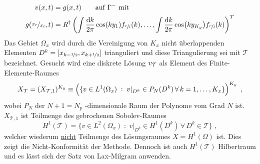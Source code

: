 \begin{equation}
  \begin{aligned}
    v(x,t) &= g(x,t) \qquad \text{auf }{\Gamma^-} \text{ mit} \\
    g(\nicefrac{x_r}{x_l},t) &= R^{\dagger} \left(\int \frac{\mathop{}\!\mathrm{d} k}{2\pi} \cos(ky_1)     f_{\nicefrac{r}{l}} (k), \dots,
                                            \int \frac{\mathop{}\!\mathrm{d} k}{2\pi} \cos(ky_{K_y}) f_{\nicefrac{r}{l}} (k)\right)^T
  \end{aligned}
\end{equation}
Das Gebiet $\Omega_x$ wird durch die Vereinigung von $K_x$ nicht überlappenden Elementen ${D^k = [x_{k-\nicefrac{1}{2}} , x_{k+\nicefrac{1}{2}}]}$ trianguliert und diese Triangulierung sei mit $\mathcal{T}$ bezeichnet. Gesucht wird eine diskrete Lösung $v_{\mathcal{T}}$ als Element des Finite-Elemente-Raumes
\begin{equation}
  X_{\mathcal{T}} = (X_{\mathcal{T},1})^{K_y} \equiv \left( \{ v \in L^1(\Omega_x) \; : \; v\rvert_{D^k} \in P_N(D^k) \, \forall \, k=1,\dots,K_x \} \right)^{K_y} \; ,
  \label{eq:FES}
\end{equation}
wobei $P_N$ der ${N+1=N_p}$ -dimensionale Raum der Polynome vom Grad $N$ ist. $X_{\mathcal{T},1}$ ist Teilmenge des gebrochenen Sobolev-Raumes
\begin{equation}
    H^1(\mathcal{T}) = \{ v \in L^2(\Omega_x) \; : \; v|_{D^k} \in H^1(D^k) \, \forall \, D^k \in \mathcal{T} \} \; ,
\end{equation}
welcher wiederum \underline{nicht} Teilmenge des Lösungsraumes $X=H^1(\Omega)$ ist. Dies zeigt die Nicht-Konformität der Methode. Dennoch ist auch $H^1(\mathcal{T})$ Hilbertraum und es lässt sich der Satz von Lax-Milgram anwenden.

